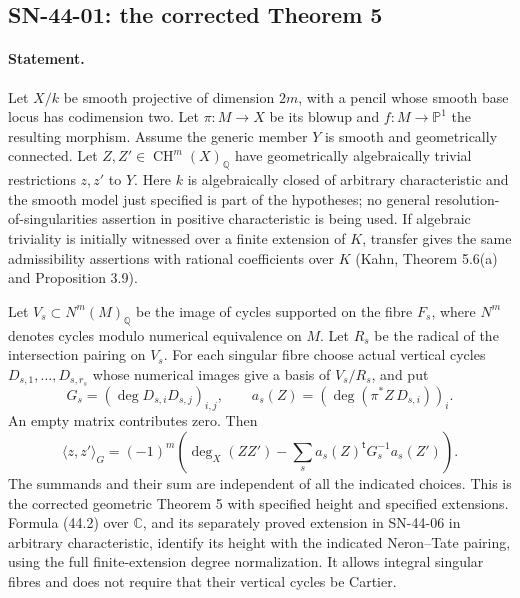 \subsection{SN-44-01: the corrected Theorem 5}
\label{sn:44-01}

\paragraph{Statement.}
Let $X/k$ be smooth projective of dimension $2m$, with a pencil
whose smooth base locus has codimension two.  Let
$\pi:M\to X$ be its blowup and $f:M\to\mathbb P^1$ the resulting
morphism.  Assume the generic member $Y$ is smooth and geometrically
connected.  Let $Z,Z'\in\operatorname{CH}^{m}(X)_{\mathbb Q}$ have
geometrically algebraically trivial restrictions $z,z'$ to $Y$.
Here $k$ is algebraically closed of arbitrary characteristic and the
smooth model just specified is part of the hypotheses; no general
resolution-of-singularities assertion in positive characteristic is
being used.  If algebraic triviality is initially witnessed over a
finite extension of $K$, transfer gives the same admissibility
assertions with rational coefficients over $K$ (Kahn, Theorem 5.6(a)
and Proposition 3.9).

Let $V_s\subset N^m(M)_{\mathbb Q}$ be the image of cycles supported
on the fibre $F_s$, where $N^m$ denotes cycles modulo numerical
equivalence on $M$.  Let $R_s$ be the radical of the intersection
pairing on $V_s$.  For each singular fibre choose actual vertical
cycles $D_{s,1},\ldots,D_{s,r_s}$ whose numerical images give a basis
of $V_s/R_s$, and put
\[
 G_s=(\deg D_{s,i}D_{s,j})_{i,j},\qquad
 a_s(Z)=(\deg(\pi^*Z\,D_{s,i}))_i.
\]
An empty matrix contributes zero.  Then
\[
 \boxed{\quad
 \langle z,z'\rangle_G
 =(-1)^m\left(\deg_X(ZZ')
       -\sum_s a_s(Z)^{\mathsf t}G_s^{-1}a_s(Z')\right).
 \quad}                                                     \tag{44.4}
 \label{eq:44-corrected}
\]
The summands and their sum are independent of all the indicated
choices.  This is the corrected geometric Theorem 5 with specified
height and specified extensions.  Formula (44.2) over $\mathbb C$,
and its separately proved extension in SN-44-06 in arbitrary
characteristic, identify its height with the indicated Neron--Tate
pairing, using the full finite-extension degree normalization.
It allows integral singular fibres and does
not require that their vertical cycles be Cartier.

